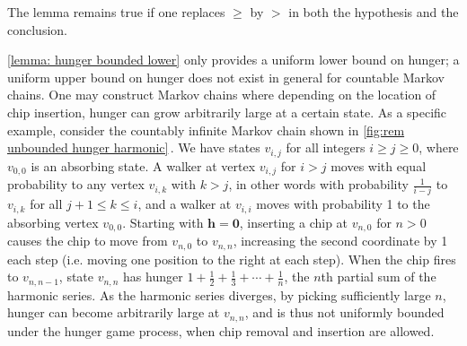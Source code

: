 The lemma remains true if one replaces $\geq$ by $>$
in both the hypothesis and the conclusion.

\bigskip

\cref{lemma: hunger bounded lower} only provides a uniform lower bound on hunger; a uniform upper bound on hunger does not exist in general for countable Markov chains.
One may construct Markov chains where depending on the location 
of chip insertion, hunger 
can grow arbitrarily large at a certain state.
As a specific example, 
consider the countably infinite Markov chain 
shown in \cref{fig:rem unbounded hunger harmonic}\,.
We have states $v_{i,j}$ for all integers $i \geq j \geq 0$, 
where $v_{0,0}$ is an absorbing state.
A walker at vertex $v_{i,j}$ for $i > j$ moves with equal probability 
to any vertex $v_{i,k}$ with $k>j$, 
in other words with probability $\frac{1}{i-j}$ to $v_{i,k}$ 
for all $j+1 \leq k \leq i$, 
and a walker at $v_{i,i}$ moves with probability 1 
to the absorbing vertex $v_{0,0}$.
Starting with $\mathbf{h}=\mathbf{0}$, 
inserting a chip at $v_{n,0}$ for $n>0$ 
causes the chip to move from $v_{n,0}$ to $v_{n,n}$, 
increasing the second coordinate by 1 each step 
(i.e. moving one position to the right at each step).
When the chip fires to $v_{n,n-1}$, 
state $v_{n,n}$ has hunger $1+\frac{1}{2}+\frac{1}{3}+\cdots+\frac{1}{n}$, 
the $n$th partial sum of the harmonic series. 
As the harmonic series diverges, by picking sufficiently large $n$, 
hunger can become arbitrarily large at $v_{n,n}$, 
and is thus not uniformly bounded under the hunger game process,
when chip removal and insertion are allowed.

